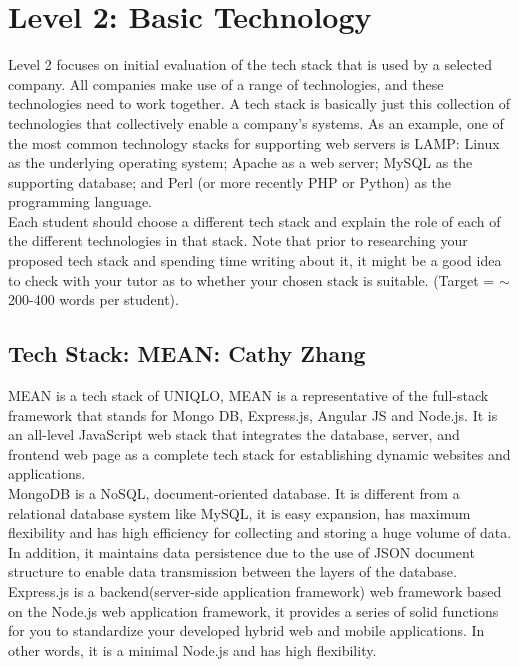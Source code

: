 \documentclass[a4paper, 11pt]{report}
\begin{document}
\newpage
\section{Level 2: Basic Technology}

Level 2 focuses on initial evaluation of the tech stack that is used by a selected company. All companies make use of a range of technologies, and these technologies need to work together. A tech stack is basically just this collection of technologies that collectively enable a company's systems. As an example, one of the most common technology stacks for supporting web servers is LAMP: Linux as the underlying operating system; Apache as a web server; MySQL as the supporting database; and Perl (or more recently PHP or Python) as the programming language.\\

Each student should choose a different tech stack and explain the role of each of the different technologies in that stack. Note that prior to researching your proposed tech stack and spending time writing about it, it might be a good idea to check with your tutor as to whether your chosen stack is suitable. (Target = $\sim$200-400 words per student).

\subsection{Tech Stack: MEAN: Cathy Zhang}

\noindent MEAN is a tech stack of UNIQLO, MEAN is a representative of the full-stack framework that stands for Mongo DB, Express.js, Angular JS and Node.js. It is an all-level JavaScript web stack that integrates the database, server, and frontend web page as a complete tech stack for establishing dynamic websites and applications. \\

\noindent MongoDB is a NoSQL, document-oriented database. It is different from a relational database system like MySQL, it is easy expansion, has maximum flexibility and has high efficiency for collecting and storing a huge volume of data. In addition, it maintains data persistence due to the use of JSON document structure to enable data transmission between the layers of the database.\\

\noindent Express.js is a backend(server-side application framework) web framework based on the Node.js web application framework, it provides a series of solid functions for you to standardize your developed hybrid web and mobile applications. In other words, it is a minimal Node.js and has high flexibility.\\
\end{document}
